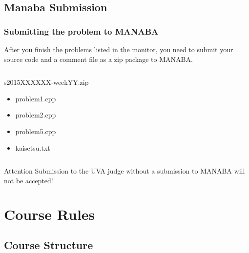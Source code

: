 \documentclass{beamer}
\begin{document}
\subsection{Manaba Submission}
\begin{frame}
  \frametitle{Submitting the problem to MANABA}

  {\small
  After you finish the problems listed in the monitor, you need to
  submit your source code and a comment file as a zip package to MANABA.}

  \medskip

  {\small
  \begin{columns}
    \begin{block}{s2015XXXXXX-weekYY.zip}
      \begin{itemize}
      \item problem1.cpp
      \item problem2.cpp
      \item problem5.cpp
      \item kaisetsu.txt
      \end{itemize}
    \end{block}
  \end{columns}
  }

  \medskip

  \begin{alertblock}{Attention}
  Submission to the UVA judge without a submission to MANABA will not
  be accepted!
  \end{alertblock}
\end{frame}

\section{Course Rules}
\subsection{Course Structure}
\end{document}
